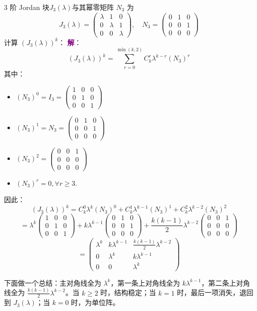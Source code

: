 \begin{example}
3 阶 Jordan 块$J_3(\lambda)$与其幂零矩阵 $N_3$ 为
$$
J_3(\lambda) = \begin{pmatrix}
\lambda & 1 & 0 \\
0 & \lambda & 1 \\
0 & 0 & \lambda
\end{pmatrix}, \quad N_3 = \begin{pmatrix}
0 & 1 & 0 \\
0 & 0 & 1 \\
0 & 0 & 0
\end{pmatrix}
$$
计算 $(J_3(\lambda))^k$：
\tcblower
\textcolor{purple}{\textbf{解}}： 
$$
(J_3(\lambda))^k = \sum_{r=0}^{\min(k, 2)} C_k^r \lambda^{k-r} (N_3)^r
$$
其中：
\begin{itemize}
	\item $(N_3)^0 = I_3 = \begin{pmatrix} 1 & 0 & 0 \\ 0 & 1 & 0 \\ 0 & 0 & 1 \end{pmatrix}$
	\item $(N_3)^1 = N_3 = \begin{pmatrix} 0 & 1 & 0 \\ 0 & 0 & 1 \\ 0 & 0 & 0 \end{pmatrix}$
	\item $(N_3)^2 = \begin{pmatrix} 0 & 0 & 1 \\ 0 & 0 & 0 \\ 0 & 0 & 0 \end{pmatrix}$
	\item $(N_3)^r = 0,\forall r \geq 3$.
\end{itemize}
因此：
$$
(J_3(\lambda))^k = C_k^0 \lambda^{k} (N_3)^0 + C_k^1 \lambda^{k-1} (N_3)^1 + C_k^2\lambda^{k-2} (N_3)^2
$$
$$
= \lambda^k \begin{pmatrix} 1 & 0 & 0 \\ 0 & 1 & 0 \\ 0 & 0 & 1 \end{pmatrix} + k\lambda^{k-1} \begin{pmatrix} 0 & 1 & 0 \\ 0 & 0 & 1 \\ 0 & 0 & 0 \end{pmatrix} + \frac{k(k-1)}{2}\lambda^{k-2} \begin{pmatrix} 0 & 0 & 1 \\ 0 & 0 & 0 \\ 0 & 0 & 0 \end{pmatrix}
$$
$$
= \begin{pmatrix}
\lambda^k & k\lambda^{k-1} & \frac{k(k-1)}{2}\lambda^{k-2} \\
0 & \lambda^k & k\lambda^{k-1} \\
0 & 0 & \lambda^k
\end{pmatrix}
$$
\end{example}
下面做一个总结：主对角线全为 $\lambda^k$，第一条上对角线全为 $k\lambda^{k-1}$，第二条上对角线全为 $\frac{k(k-1)}{2}\lambda^{k-2}$。当 $k \geq 2$ 时，结构稳定；当 $k=1$ 时，最后一项消失，退回到 $J_3(\lambda)$；当 $k=0$ 时，为单位阵。

